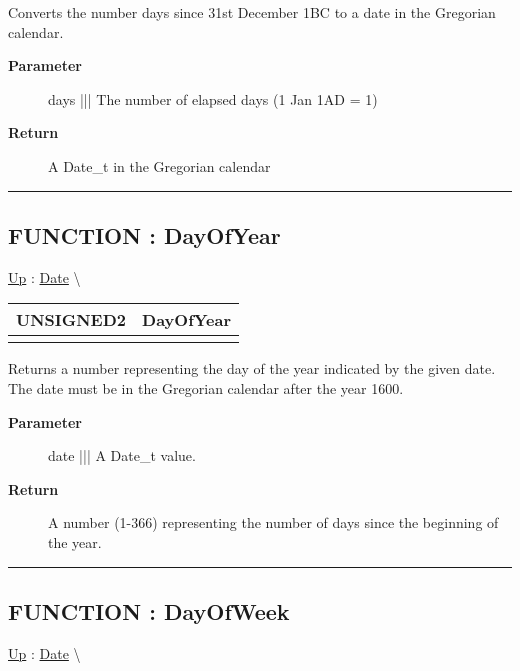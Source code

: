 \par
Converts the number days since 31st December 1BC to a date in the Gregorian calendar.

\par
\begin{description}
\item [\textbf{Parameter}] days ||| The number of elapsed days (1 Jan 1AD = 1)
\item [\textbf{Return}] A Date\_t in the Gregorian calendar
\end{description}

\rule{\linewidth}{0.5pt}
\subsection*{FUNCTION : DayOfYear}
\hypertarget{ecldoc:date.dayofyear}{}
\hyperlink{ecldoc:Date}{Up} :
\hspace{0pt} \hyperlink{ecldoc:Date}{Date} \textbackslash 

{\renewcommand{\arraystretch}{1.5}
\begin{tabularx}{\textwidth}{|>{\raggedright\arraybackslash}l|X|}
\hline
\hspace{0pt}UNSIGNED2 & DayOfYear \\
\hline
\multicolumn{2}{|>{\raggedright\arraybackslash}X|}{\hspace{0pt}(Date\_t date)} \\
\hline
\end{tabularx}
}

\par
Returns a number representing the day of the year indicated by the given date. The date must be in the Gregorian calendar after the year 1600.

\par
\begin{description}
\item [\textbf{Parameter}] date ||| A Date\_t value.
\item [\textbf{Return}] A number (1-366) representing the number of days since the beginning of the year.
\end{description}

\rule{\linewidth}{0.5pt}
\subsection*{FUNCTION : DayOfWeek}
\hypertarget{ecldoc:date.dayofweek}{}
\hyperlink{ecldoc:Date}{Up} :
\hspace{0pt} \hyperlink{ecldoc:Date}{Date} \textbackslash 

